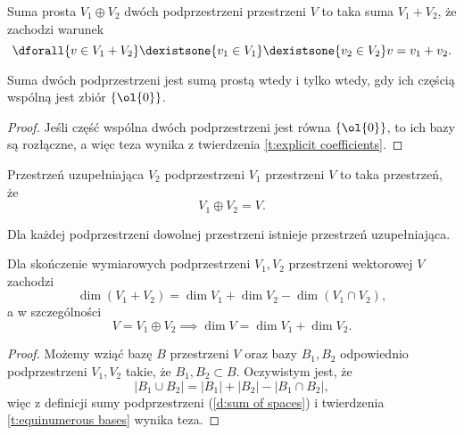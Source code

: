 \begin{definition}
    Suma prosta $V_1 \oplus V_2$ dwóch podprzestrzeni przestrzeni $V$ to taka suma $V_1 + V_2$, że zachodzi warunek
    \[ \dforall{v \in V_1 + V_2} \dexistsone{v_1 \in V_1} \dexistsone{v_2 \in V_2} v = v_1 + v_2. \]
\end{definition}

\begin{theorem}
    Suma dwóch podprzestrzeni jest sumą prostą wtedy i tylko wtedy, gdy ich częścią wspólną jest zbiór $\{\ol{0}\}$.
\end{theorem}
\begin{proof}
    Jeśli część wspólna dwóch podprzestrzeni jest równa $\{\ol{0}\}$, to ich bazy są rozłączne, a więc teza wynika z twierdzenia \ref{t:explicit coefficients}.
\end{proof}

\begin{definition}
    Przestrzeń uzupełniająca $V_2$ podprzestrzeni $V_1$ przestrzeni $V$ to taka przestrzeń, że
    \[ V_1 \oplus V_2 = V. \]
\end{definition}

\begin{fact}
    Dla każdej podprzestrzeni dowolnej przestrzeni istnieje przestrzeń uzupełniająca.
\end{fact}

\begin{theorem}[Grassmana]
    Dla skończenie wymiarowych podprzestrzeni $V_1, V_2$ przestrzeni wektorowej $V$ zachodzi
    \[ \dim(V_1 + V_2) = \dim V_1 + \dim V_2 - \dim(V_1 \cap V_2), \]
    a w szczególności
    \[ V = V_1 \oplus V_2 \implies \dim V = \dim V_1 + \dim V_2. \]
\end{theorem}
\begin{proof}
    Możemy wziąć bazę $B$ przestrzeni $V$ oraz bazy $B_1, B_2$ odpowiednio podprzestrzeni $V_1, V_2$ takie, że $B_1, B_2 \subset B$. Oczywistym jest, że
    \[ |B_1 \cup B_2| = |B_1| + |B_2| - |B_1 \cap B_2|, \]
    więc z definicji sumy podprzestrzeni (\ref{d:sum of spaces}) i twierdzenia \ref{t:equinumerous bases} wynika teza.
\end{proof}